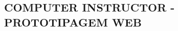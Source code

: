 \begin{apendicesenv}


\chapter{COMPUTER INSTRUCTOR - PROTOTIPAGEM WEB}
\label{chap:apendiceB}


\end{apendicesenv}


